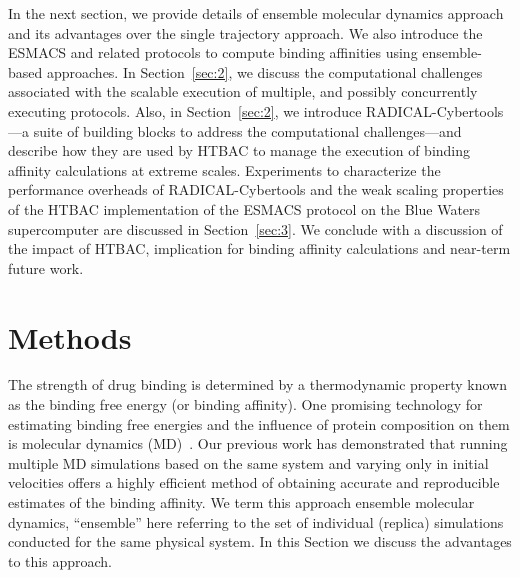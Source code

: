 \documentclass{bmcart}
\begin{document}


In the next section, we provide details of ensemble molecular dynamics
approach and its advantages over the single trajectory approach. We also
introduce the ESMACS and related protocols to compute binding affinities
using ensemble-based approaches. In Section~\ref{sec:2}, we discuss the
computational challenges associated with the scalable execution of multiple,
and possibly concurrently executing protocols. Also, in Section~\ref{sec:2}, 
we introduce RADICAL-Cybertools---a suite of building blocks to address the 
computational challenges---and describe how they are used by HTBAC to
manage the execution of binding affinity calculations at extreme scales.
Experiments to characterize the performance overheads of RADICAL-Cybertools
and the weak scaling properties of the HTBAC implementation of the ESMACS
protocol on the Blue Waters supercomputer are discussed in
Section~\ref{sec:3}. 
We conclude with a discussion of the impact of HTBAC, implication for binding
affinity calculations and near-term future work.


\section*{Methods}\label{sec:2}
The strength of drug binding is determined by a thermodynamic property known
as the binding free energy (or binding affinity). One promising technology for
estimating binding free energies and the influence of protein composition on
them is molecular dynamics (MD)~\cite{Karplus2005}. Our previous work
\cite{Sadiq2010, Wan2011} has demonstrated that running multiple MD
simulations based on the same system and varying only in initial velocities
offers a highly efficient method of obtaining accurate and reproducible
estimates of the binding affinity. We term this approach ensemble molecular
dynamics, ``ensemble'' here referring to the set of individual (replica)
simulations conducted for the same physical system. In this Section we discuss
the advantages to this approach.
\end{document}
